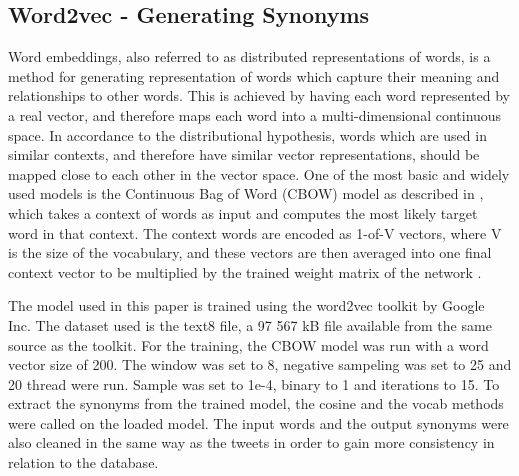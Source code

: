 





\subsection{Word2vec - Generating Synonyms}
Word embeddings, also referred to as distributed representations of words, is a method for generating representation of words which capture their meaning and relationships to other words. This is achieved by having each word represented by a real vector, and therefore maps each word into a multi-dimensional continuous space. In accordance to the distributional hypothesis, words which are used in similar contexts, and therefore have similar vector representations, should be mapped close to each other in the vector space. One of the most basic and widely used models is the Continuous Bag of Word (CBOW) model as described in \cite{wordRep}, which takes a context of words as input and computes the most likely target word in that context. The context words are encoded as 1-of-V vectors, where V is the size of the vocabulary, and these vectors are then averaged into one final context vector to be multiplied by the trained weight matrix of the network \cite{wordRep}.


The model used in this paper is trained using the word2vec toolkit by Google Inc. The dataset used is the text8 file, a 97 567 kB file available from the same source as the toolkit. For the training, the CBOW model was run with a word vector size of 200. The window was set to 8, negative sampeling was set to 25 and 20 thread were run. Sample was set to 1e-4, binary to 1 and iterations to 15. To extract the synonyms from the trained model, the cosine and the vocab methods were called on the loaded model. The input words and the output synonyms were also cleaned in the same way as the tweets in order to gain more consistency in relation to the database.
